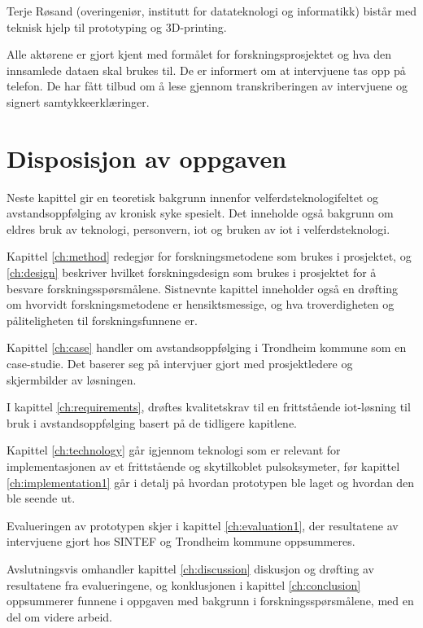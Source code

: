 Terje Røsand (overingeniør, institutt for datateknologi og informatikk) bistår med teknisk hjelp til prototyping og 3D-printing.

Alle aktørene er gjort kjent med formålet for forskningsprosjektet og hva den innsamlede dataen skal brukes til. De er informert om at
intervjuene tas opp på telefon. De har fått tilbud om å lese gjennom transkriberingen av intervjuene og signert
samtykkeerklæringer.

\section{Disposisjon av oppgaven}
Neste kapittel gir en teoretisk bakgrunn innenfor velferdsteknologifeltet og avstandsoppfølging av kronisk syke spesielt.
Det inneholde også bakgrunn om eldres bruk av teknologi, personvern, \gls{iot} og bruken av \gls{iot} i velferdsteknologi.

Kapittel \ref{ch:method} redegjør for forskningsmetodene som brukes i prosjektet, og \ref{ch:design} beskriver hvilket forskningsdesign som brukes i prosjektet for å besvare forskningsspørsmålene.
Sistnevnte kapittel inneholder også en drøfting om hvorvidt forskningsmetodene er hensiktsmessige, og hva troverdigheten og påliteligheten til forskningsfunnene er.

Kapittel \ref{ch:case} handler om avstandsoppfølging i Trondheim kommune som en case-studie. Det baserer seg på intervjuer gjort med
prosjektledere og skjermbilder av løsningen.

I kapittel \ref{ch:requirements}, drøftes kvalitetskrav til en frittstående \gls{iot}-løsning til bruk i avstandsoppfølging basert på de tidligere
kapitlene.

Kapittel \ref{ch:technology} går igjennom teknologi som er relevant for implementasjonen av et frittstående og skytilkoblet pulsoksymeter,
før kapittel \ref{ch:implementation1} går i detalj på hvordan prototypen ble laget og hvordan den ble seende ut.

Evalueringen av prototypen skjer i kapittel \ref{ch:evaluation1}, der resultatene av intervjuene gjort hos SINTEF og Trondheim kommune oppsummeres.

Avslutningsvis omhandler kapittel \ref{ch:discussion} diskusjon og drøfting av resultatene fra evalueringene, og konklusjonen i kapittel \ref{ch:conclusion}
oppsummerer funnene i oppgaven med bakgrunn i forskningsspørsmålene, med en del om videre arbeid.
